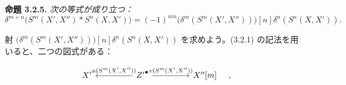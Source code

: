 \medskip\noindent\textbf{命題 3.2.5.}\quad
\textit{次の等式が成り立つ：}
\[
\delta^{m+n}\bigl(S^m(X',X'')*S^n(X,X')\bigr)=
(-1)^{mn}\bigl(\delta^m(S^m(X',X''))\bigr)[n]
\delta^n(S^n(X,X')).
\]

射 $\bigl(\delta^m(S^m(X',X''))\bigr)[n]\delta^n(S^n(X,X'))$
を求めよう。(3.2.1) の記法を用いると、二つの図式がある：

\[
\begin{tikzcd}[column sep=4.5em]
X' & {Z'}^\bullet
  \arrow[l,"{u(S^m(X',X''))}"']
  \arrow[r,"{v(S^m(X',X''))}"]
& X''[m]
\end{tikzcd}
\quad,
\]
\endgroup

